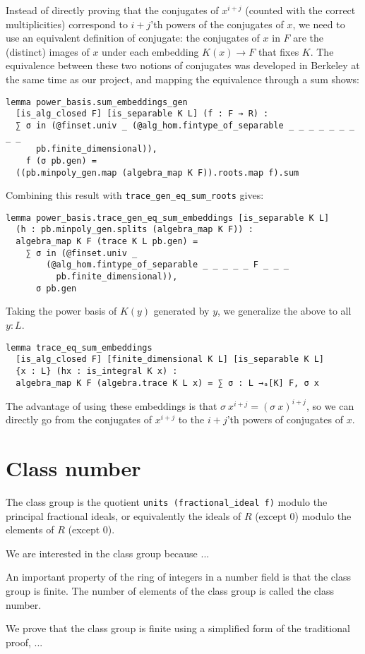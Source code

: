 \documentclass{lipics-v2021}
\newcommand{\lean}[1]{\texttt{#1}\xspace} %
\begin{document}
Instead of directly proving that the conjugates of $x^{i + j}$ (counted with the correct multiplicities) correspond to $i + j$'th powers of the conjugates of $x$,
we need to use an equivalent definition of conjugate:
the conjugates of $x$ in $F$ are the (distinct) images of $x$ under each embedding $K(x) \to F$ that fixes $K$.
The equivalence between these two notions of conjugates was developed in Berkeley at the same time as our project, and mapping the equivalence through a sum shows: %
\begin{lstlisting}
lemma power_basis.sum_embeddings_gen
  [is_alg_closed F] [is_separable K L] (f : F → R) :
  ∑ σ in (@finset.univ _ (@alg_hom.fintype_of_separable _ _ _ _ _ _ _ _ _
      pb.finite_dimensional)),
    f (σ pb.gen) =
  ((pb.minpoly_gen.map (algebra_map K F)).roots.map f).sum
\end{lstlisting}
Combining this result with \lean{trace\_gen\_eq\_sum\_roots} gives:
\begin{lstlisting}
lemma power_basis.trace_gen_eq_sum_embeddings [is_separable K L]
  (h : pb.minpoly_gen.splits (algebra_map K F)) :
  algebra_map K F (trace K L pb.gen) =
    ∑ σ in (@finset.univ _
        (@alg_hom.fintype_of_separable _ _ _ _ _ F _ _ _
          pb.finite_dimensional)),
      σ pb.gen
\end{lstlisting}
Taking the power basis of $K(y)$ generated by $y$, we generalize the above to all $y : L$.
\begin{lstlisting}
lemma trace_eq_sum_embeddings
  [is_alg_closed F] [finite_dimensional K L] [is_separable K L]
  {x : L} (hx : is_integral K x) :
  algebra_map K F (algebra.trace K L x) = ∑ σ : L →ₐ[K] F, σ x
\end{lstlisting}
The advantage of using these embeddings is that $\sigma\ x^{i + j} = (\sigma\ x)^{i + j}$,
so we can directly go from the conjugates of $x^{i + j}$ to the $i + j$'th powers of conjugates of $x$.

\section{Class number}

The class group is the quotient \lean{units (fractional\_ideal f)} modulo the principal fractional ideals, or equivalently the ideals of $R$ (except $0$) modulo the elements of $R$ (except $0$).

We are interested in the class group because ...

An important property of the ring of integers in a number field is that the class group is finite. The number of elements of the class group is called the class number.

We prove that the class group is finite using a simplified form of the traditional proof, ...
\end{document}
